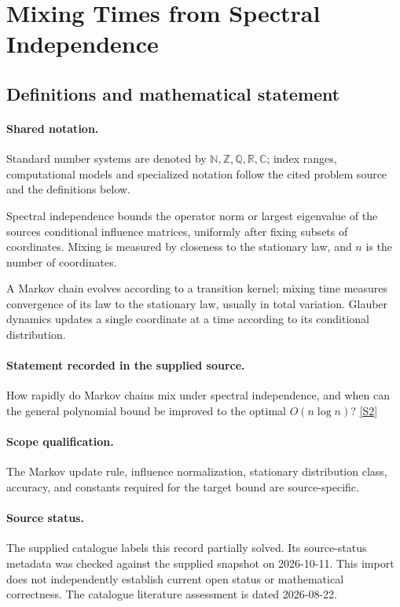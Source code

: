 \documentclass[11pt]{article}
\newcommand{\sref}[2]{\hyperlink{source:#1:#2}{[S#2]}}
\begin{document}
\section{Mixing Times from Spectral Independence}\label{statement}

\subsection{Definitions and mathematical statement}

\paragraph{Shared notation.}Standard number systems are denoted by $\mathbb N,\mathbb Z,\mathbb Q,\mathbb R,\mathbb C$; index ranges, computational models and specialized notation follow the cited problem source and the definitions below.


Spectral independence bounds the operator norm or largest eigenvalue of the source\textquotesingle s conditional influence matrices, uniformly after fixing subsets of coordinates. Mixing is measured by closeness to the stationary law, and $n$ is the number of coordinates.

A Markov chain evolves according to a transition kernel; mixing time measures convergence of its law to the stationary law, usually in total variation. Glauber dynamics updates a single coordinate at a time according to its conditional distribution.
\paragraph{Statement recorded in the supplied source.}
How rapidly do Markov chains mix under spectral independence, and when can the general polynomial bound be improved to the optimal $O(n\log n)$? \sref{statement}{2}
\paragraph{Scope qualification.}
The Markov update rule, influence normalization, stationary distribution class, accuracy, and constants required for the target bound are source-specific.
\paragraph{Source status.}
The supplied catalogue labels this record partially solved. Its source-status metadata was checked against the supplied snapshot on 2026-10-11. This import does not independently establish current open status or mathematical correctness. The catalogue literature assessment is dated 2026-08-22.
\end{document}
